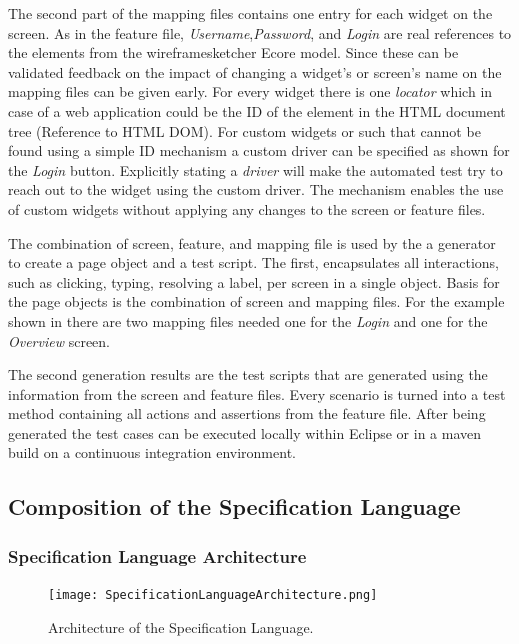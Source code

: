 \documentclass{sig-alternate-05-2015}
\begin{document}
The second part of the mapping files contains one entry for each widget on the screen.
As in the feature file, \textit{Username},\textit{Password}, and \textit{Login} are real references to the elements from the wireframesketcher Ecore model.
Since these can be validated feedback on the impact of changing a widget's or screen's name on the mapping files can be given early.
For every widget there is one \textit{locator} which in case of a web application could be the ID of the element in the HTML document tree (Reference to HTML DOM).
For custom widgets or such that cannot be found using a simple ID mechanism a custom driver can be specified as shown for the \textit{Login} button.
Explicitly stating a \textit{driver} will make the automated test try to reach out to the widget using the custom driver. 
The mechanism enables the use of custom widgets without applying any changes to the screen or feature files.

The combination of screen, feature, and mapping file is used by the a generator to create a page object and a test script.
The first, encapsulates all interactions, such as clicking, typing, resolving a label, per screen in a single object.
Basis for the page objects is the combination of screen and mapping files.
For the example shown in  there are two mapping files needed one for the \textit{Login} and one for the \textit{Overview} screen.

The second generation results are the test scripts that are generated using the information from the screen and feature files.
Every scenario is turned into a test method containing all actions and assertions from the feature file.
After being generated the test cases can be executed locally within Eclipse or in a maven build on a continuous integration environment.

\subsection{Composition of the Specification Language}
\subsubsection{Specification Language Architecture}
\begin{figure}[h]
	\centering
	\texttt{[image: SpecificationLanguageArchitecture.png]}
	\caption{Architecture of the Specification Language.}
	\label{fig:architectureOverview}
\end{figure}
\end{document}
